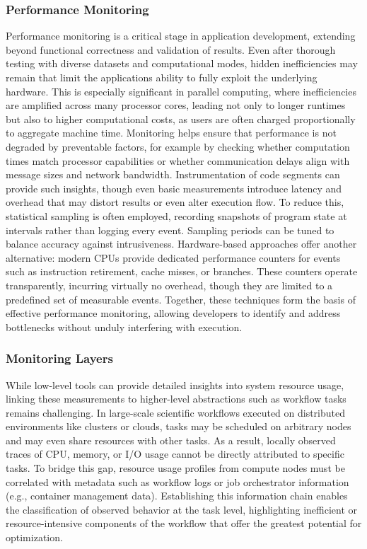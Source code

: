 \subsubsection{Performance Monitoring}
\label{sec:background_monitoring_performance}
Performance monitoring is a critical stage in application development, extending beyond functional correctness and validation of results. Even after thorough testing with diverse datasets and computational modes, hidden inefficiencies may remain that limit the applications ability to fully exploit the underlying hardware. This is especially significant in parallel computing, where inefficiencies are amplified across many processor cores, leading not only to longer runtimes but also to higher computational costs, as users are often charged proportionally to aggregate machine time. Monitoring helps ensure that performance is not degraded by preventable factors, for example by checking whether computation times match processor capabilities or whether communication delays align with message sizes and network bandwidth. Instrumentation of code segments can provide such insights, though even basic measurements introduce latency and overhead that may distort results or even alter execution flow. To reduce this, statistical sampling is often employed, recording snapshots of program state at intervals rather than logging every event. Sampling periods can be tuned to balance accuracy against intrusiveness. Hardware-based approaches offer another alternative: modern CPUs provide dedicated performance counters for events such as instruction retirement, cache misses, or branches. These counters operate transparently, incurring virtually no overhead, though they are limited to a predefined set of measurable events. Together, these techniques form the basis of effective performance monitoring, allowing developers to identify and address bottlenecks without unduly interfering with execution.

\subsubsection{Monitoring Layers}
\label{sec:background_monitoring_layers}
While low-level tools can provide detailed insights into system resource usage, linking these measurements to higher-level abstractions such as workflow tasks remains challenging. In large-scale scientific workflows executed on distributed environments like clusters or clouds, tasks may be scheduled on arbitrary nodes and may even share resources with other tasks. As a result, locally observed traces of CPU, memory, or I/O usage cannot be directly attributed to specific tasks. To bridge this gap, resource usage profiles from compute nodes must be correlated with metadata such as workflow logs or job orchestrator information (e.g., container management data). Establishing this information chain enables the classification of observed behavior at the task level, highlighting inefficient or resource-intensive components of the workflow that offer the greatest potential for optimization.

